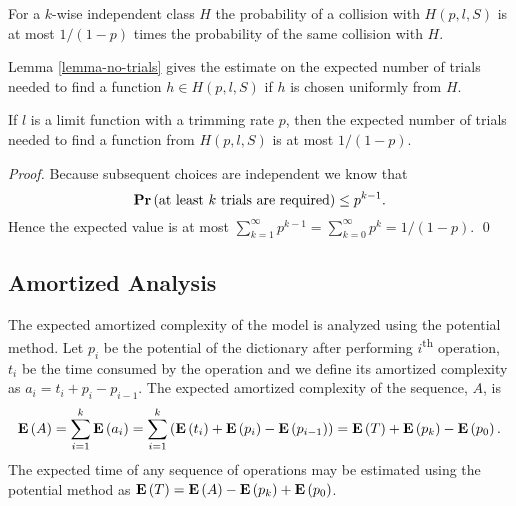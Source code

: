 For a $k$-wise independent class $H$ the probability of a collision with $H(p, l, S)$ is at most $1 / (1 - p)$ times the probability of the same collision with $H$.

Lemma \ref{lemma-no-trials} gives the estimate on the expected number of trials needed to find a function $h \in H(p, l, S)$ if $h$ is chosen uniformly from $H$.

\begin{lemma}
\label{lemma-no-trials}
If $l$ is a limit function with a trimming rate $p$, then the expected number of trials needed to find a function from $H(p, l, S)$ is at most ${1}/{(1 - p)}$.
\end{lemma}
\begin{proof}
Because subsequent choices are independent we know that \[\mathbf{Pr}\left(\mbox{at least }k\mbox{ trials are required}\right) \leq p^{k - 1}.\]
Hence the expected value is at most $\sum_{k = 1}^{\infty} p^{k - 1} = \sum_{k = 0}^{\infty} p^k = {1}/{(1 - p)}.$
\qed
\end{proof}

\subsection{Amortized Analysis}
The expected amortized complexity of the model is analyzed using the potential method. Let $p_i$ be the potential of the dictionary after performing $i$\textsuperscript{th} operation, $t_i$ be the time consumed by the operation and we define its amortized complexity as $a_i = t_i + p_i - p_{i - 1}$. The expected amortized complexity of the sequence, $A$, is
\[
\mathbf{E}\left(A\right) = \sum_{i=1}^{k} \mathbf{E}\left(a_i\right) = \sum_{i = 1}^{k} \left(\mathbf{E}\left(t_i\right) + \mathbf{E}\left(p_i\right) - \mathbf{E}\left(p_{i - 1}\right)\right) = \mathbf{E}\left(T\right) + \mathbf{E}\left(p_k\right) - \mathbf{E}\left(p_0\right).
\]
The expected time of any sequence of operations may be estimated using the potential method as $\mathbf{E}\left(T\right) = \mathbf{E}\left(A\right) - \mathbf{E}\left(p_k\right) + \mathbf{E}\left(p_0\right)$.

